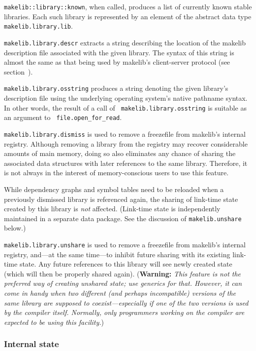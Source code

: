{\tt makelib::library::known}, when called, produces a list of currently
known stable libraries.  Each such library is represented by an
element of the abstract data type {\tt makelib.library.lib}.

{\tt makelib.library.descr} extracts a string describing the location of
the makelib description file associated with the given library.  The syntax
of this string is almost the same as that being used by makelib's
client-server protocol (see section~).

{\tt makelib.library.osstring} produces a string denoting the given
library's description file using the underlying operating system's
native pathname syntax.  In other words, the result of a call of {\tt
makelib.library.osstring} is suitable as an argument to {\tt
file.open_for_read}.

{\tt makelib.library.dismiss} is used to remove a freezefile from makelib's
internal registry.  Although removing a library from the registry may
recover considerable amounts of main memory, doing so also eliminates
any chance of sharing the associated data structures with later
references to the same library.  Therefore, it is not always in the
interest of memory-conscious users to use this feature.

While dependency graphs and symbol tables need to be reloaded when a
previously dismissed library is referenced again, the sharing of
link-time state created by this library is {\em not} affected.
(Link-time state is independently maintained in a separate data
package.  See the discussion of {\tt makelib.unshare} below.)

{\tt makelib.library.unshare} is used to remove a freezefile from makelib's
internal registry, and---at the same time---to inhibit future sharing
with its existing link-time state.  Any future references to this
library will see newly created state (which will then be properly
shared again).  ({\bf Warning:} {\it This feature is not the preferred
way of creating unshared state; use generics for that.  However, it
can come in handy when two different (and perhaps incompatible)
versions of the same library are supposed to coexist---especially if
one of the two versions is used by the compiler itself.  Normally, only
programmers working on the compiler are expected to be using this
facility.})

\subsubsection{Internal state}

